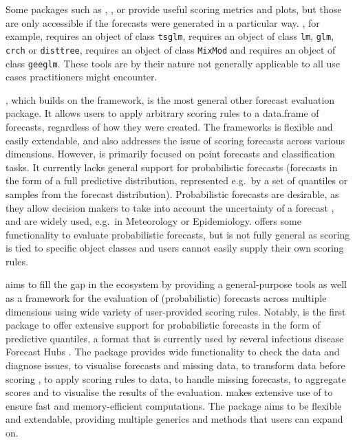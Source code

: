 \documentclass[
]{jss}
\begin{document}
Some packages such as  \citep{tscount}, 
\citep{topmodels},  \citep{GLMMadaptive} or
 \citep{cvGEE} provide useful scoring metrics and plots, but
those are only accessible if the forecasts were generated in a
particular way. , for example, requires an object of class
\texttt{tsglm},  requires an object of class \texttt{lm},
\texttt{glm}, \texttt{crch} or \texttt{disttree}, 
requires an object of class \texttt{MixMod} and  requires an
object of class \texttt{geeglm}. These tools are by their nature not
generally applicable to all use cases practitioners might encounter.

 \citep{yardstick}, which builds on the 
\citep{tidymodels} framework, is the most general other forecast
evaluation package. It allows users to apply arbitrary scoring rules to
a data.frame of forecasts, regardless of how they were created. The
frameworks is flexible and easily extendable, and also addresses the
issue of scoring forecasts across various dimensions. However,
 is primarily focused on point forecasts and
classification tasks. It currently lacks general support for
probabilistic forecasts (forecasts in the form of a full predictive
distribution, represented e.g.~by a set of quantiles or samples from the
forecast distribution). Probabilistic forecasts are desirable, as they
allow decision makers to take into account the uncertainty of a forecast
\citep{gneitingProbabilisticForecastsCalibration2007}, and are widely
used, e.g.~in Meteorology or Epidemiology. 
\citep{fabletools} offers some functionality to evaluate probabilistic
forecasts, but is not fully general as scoring is tied to specific
object classes and users cannot easily supply their own scoring rules.

 aims to fill the gap in the ecosystem by providing a
general-purpose tools as well as a framework for the evaluation of
(probabilistic) forecasts across multiple dimensions using wide variety
of user-provided scoring rules. Notably,  is the first
package to offer extensive support for probabilistic forecasts in the
form of predictive quantiles, a format that is currently used by several
infectious disease Forecast Hubs
\citep{reichCollaborativeMultiyearMultimodel2019, cramerCOVID19ForecastHub2020, europeancovid-19forecasthubEuropeanCovid19Forecast2021, bracherNationalSubnationalShortterm2021}.
The package provides wide functionality to check the data and diagnose
issues, to visualise forecasts and missing data, to transform data
before scoring \citep{bosseScoringEpidemiologicalForecasts2023}, to
apply scoring rules to data, to handle missing forecasts, to aggregate
scores and to visualise the results of the evaluation.
 makes extensive use of 
\citep{data.table} to ensure fast and memory-efficient computations. The
package aims to be flexible and extendable, providing multiple generics
and methods that users can expand on.
\end{document}
